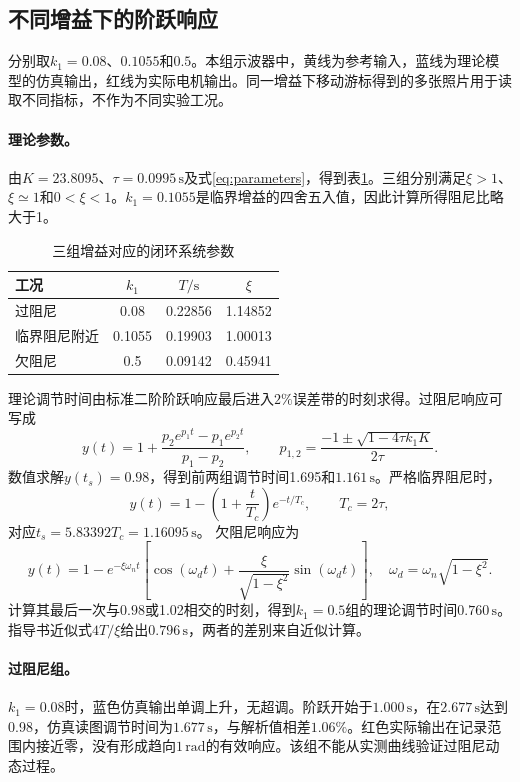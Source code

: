 \documentclass[12pt]{article}
\newcommand{\unit}[1]{\,\mathrm{#1}}
\begin{document}
\subsection{不同增益下的阶跃响应}
分别取$k_1=0.08$、$0.1055$和$0.5$。本组示波器中，黄线为参考输入，蓝线为理论模型的仿真输出，红线为实际电机输出。同一增益下移动游标得到的多张照片用于读取不同指标，不作为不同实验工况。

\paragraph{理论参数。}
由$K=23.8095$、$\tau=0.0995\unit{s}$及式\eqref{eq:parameters}，得到表\ref{tab:gain_parameters}。三组分别满足$\xi>1$、$\xi\simeq1$和$0<\xi<1$。$k_1=0.1055$是临界增益的四舍五入值，因此计算所得阻尼比略大于1。

\begin{table}[H]
\centering
\caption{三组增益对应的闭环系统参数}
\begin{tabular}{lccc}
\hline
工况 & $k_1$ & $T/\mathrm{s}$ & $\xi$\\
\hline
过阻尼 & 0.08 & 0.22856 & 1.14852\\
临界阻尼附近 & 0.1055 & 0.19903 & 1.00013\\
欠阻尼 & 0.5 & 0.09142 & 0.45941\\
\hline
\end{tabular}
\label{tab:gain_parameters}
\end{table}

理论调节时间由标准二阶阶跃响应最后进入$2\%$误差带的时刻求得。过阻尼响应可写成
\begin{equation}
 y(t)=1+\frac{p_2e^{p_1t}-p_1e^{p_2t}}{p_1-p_2},\qquad
 p_{1,2}=\frac{-1\pm\sqrt{1-4\tau k_1K}}{2\tau}.
\end{equation}
数值求解$y(t_s)=0.98$，得到前两组调节时间1.695和$1.161\unit{s}$。严格临界阻尼时，
\begin{equation}
 y(t)=1-\left(1+\frac{t}{T_c}\right)e^{-t/T_c},\qquad
 T_c=2\tau,
\end{equation}
对应$t_s=5.83392T_c=1.16095\unit{s}$。
欠阻尼响应为
\begin{equation}
 y(t)=1-e^{-\xi\omega_nt}
 \left[\cos(\omega_dt)+\frac{\xi}{\sqrt{1-\xi^2}}\sin(\omega_dt)\right],
 \quad \omega_d=\omega_n\sqrt{1-\xi^2}.
\end{equation}
计算其最后一次与$0.98$或1.02相交的时刻，得到$k_1=0.5$组的理论调节时间$0.760\unit{s}$。指导书近似式$4T/\xi$给出$0.796\unit{s}$，两者的差别来自近似计算。

\paragraph{过阻尼组。}
$k_1=0.08$时，蓝色仿真输出单调上升，无超调。阶跃开始于$1.000\unit{s}$，在$2.677\unit{s}$达到0.98，仿真读图调节时间为$1.677\unit{s}$，与解析值相差$1.06\%$。红色实际输出在记录范围内接近零，没有形成趋向$1\unit{rad}$的有效响应。该组不能从实测曲线验证过阻尼动态过程。
\end{document}
